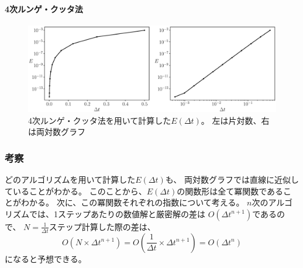 \documentclass[a4j, titlepage]{jsarticle}
\numberwithin{equation}{section}
\begin{document}
            \paragraph{4次ルンゲ・クッタ法}
                \begin{center}
                    \begin{figure}[h]
                        \centering
                        \includegraphics[width=1\hsize]{kadai3/runge_kutta.eps}
                        \caption{
                            4次ルンゲ・クッタ法を用いて計算した$E(\Delta t)$。
                            左は片対数、右は両対数グラフ
                        }
                    \end{figure}
                \end{center}

        \subsubsection{考察}
            どのアルゴリズムを用いて計算した$E(\Delta t)$も、
            両対数グラフでは直線に近似していることがわかる。
            このことから、$E(\Delta t)$の関数形は全て冪関数であることがわかる。
            次に、この冪関数それぞれの指数について考える。
            $n$次のアルゴリズムでは、1ステップあたりの数値解と厳密解の差は
            $O(\Delta t^{n + 1})$であるので、
            $N=\displaystyle\frac{1}{\Delta t}$ステップ計算した際の差は、
            \begin{equation}
                O(N\times\Delta t^{n + 1}) = O\left(\frac{1}{\Delta t}\times\Delta t^{n + 1}\right) = O(\Delta t^n) \label{equ:guess}
            \end{equation}
            になると予想できる。
\end{document}
